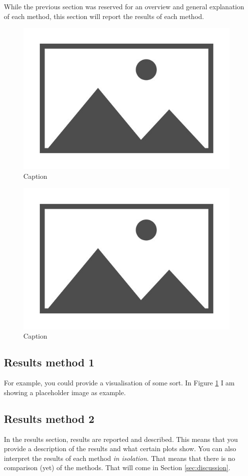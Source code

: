 \documentclass[twocolumn]{article}
\begin{document}
While the previous section was reserved for an overview and general explanation of each method, this section will report the results of each method. 

\begin{figure}[h!]
    \centering
    \includegraphics[width=0.5\linewidth]{images/placeholder.jpg}
    \caption{Caption}
    \label{fig:placeholder1}
\end{figure}


\begin{figure}[t]
    \centering
    \includegraphics[width=0.55\linewidth]{images/placeholder.jpg}
    \caption{Caption}
    \label{fig:placeholder2}
\end{figure}

\subsection{Results method 1}

For example, you could provide a visualisation of some sort. In Figure \ref{fig:placeholder1} I am showing a placeholder image as example.


\subsection{Results method 2}

In the results section, results are reported and described. This means that you provide a description of the results and what certain plots show. You can also interpret the results of each method \textit{in isolation}. That means that there is no comparison (yet) of the methods. That will come in Section \ref{sec:discussion}.
\end{document}
